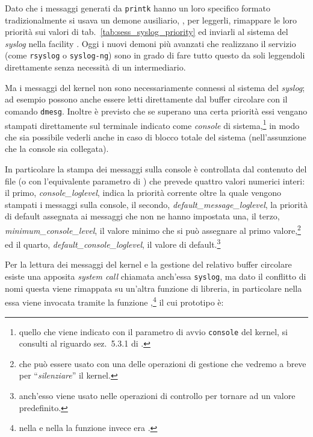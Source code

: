 Dato che i messaggi generati da \texttt{printk} hanno un loro specifico
formato tradizionalmente si usava un demone ausiliario, , per
leggerli, rimappare le loro priorità sui valori di
tab.~\ref{tab:sess_syslog_priority} ed inviarli al sistema del \textit{syslog}
nella facility .  Oggi i nuovi demoni più avanzati che
realizzano il servizio (come \texttt{rsyslog} o \texttt{syslog-ng}) sono in
grado di fare tutto questo da soli leggendoli direttamente senza necessità di
un intermediario.

Ma i messaggi del kernel non sono necessariamente connessi al sistema del
\textit{syslog}; ad esempio possono anche essere letti direttamente dal buffer
circolare con il comando \texttt{dmesg}. Inoltre è previsto che se superano
una certa priorità essi vengano stampati direttamente sul terminale indicato
come \textit{console} di sistema,\footnote{quello che viene indicato con il
  parametro di avvio \texttt{console} del kernel, si consulti al riguardo
  sez.~5.3.1 di \cite{AGL}.}  in modo che sia possibile vederli anche in caso
di blocco totale del sistema (nell'assunzione che la console sia collegata).

In particolare la stampa dei messaggi sulla console è controllata dal
contenuto del file  (o con l'equivalente parametro
di ) che prevede quattro valori numerici interi: il primo,
\textit{console\_loglevel}, indica la priorità corrente oltre la quale vengono
stampati i messaggi sulla console, il secondo,
\textit{default\_message\_loglevel}, la priorità di default assegnata ai
messaggi che non ne hanno impostata una, il terzo,
\textit{minimum\_console\_level}, il valore minimo che si può assegnare al
primo valore,\footnote{che può essere usato con una delle operazioni di
  gestione che vedremo a breve per ``\textsl{silenziare}'' il kernel.} ed il
quarto, \textit{default\_console\_loglevel}, il valore di
default.\footnote{anch'esso viene usato nelle operazioni di controllo per
  tornare ad un valore predefinito.}

Per la lettura dei messaggi del kernel e la gestione del relativo buffer
circolare esiste una apposita \textit{system call} chiamata anch'essa
 \texttt{syslog}, ma dato il conflitto di nomi questa viene rimappata su
 un'altra funzione di libreria, in particolare nella  essa viene
 invocata tramite la funzione ,\footnote{nella  e
   nella  la funzione invece era .} il cui prototipo
 è:

